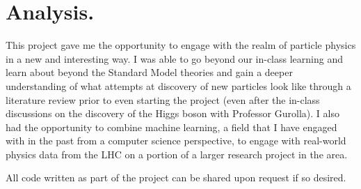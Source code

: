 \documentclass[twocolumn]{webofc}
\begin{document}
\section*{Analysis.}\label{sec:readme}
This project gave me the opportunity to engage with the realm of particle physics in a new and interesting way. I was able to go beyond our in-class learning and learn about beyond the Standard Model theories and gain a deeper understanding of what attempts at discovery of new particles look like through a literature review prior to even starting the project (even after the in-class discussions on the discovery of the Higgs boson with Professor Gurolla). I also had the opportunity to combine machine learning, a field that I have engaged with in the past from a computer science perspective, to engage with real-world physics data from the LHC on a portion of a larger research project in the area.

All code written as part of the project can be shared upon request if so desired.


\end{document}
